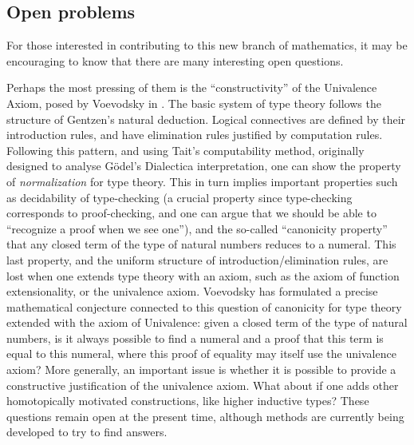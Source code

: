 %

\subsection{Open problems} 

%

For those interested in contributing to this new branch of mathematics, it may be encouraging to know that there are many interesting open questions.

%
Perhaps the most pressing of them is the ``constructivity'' of the Univalence Axiom, posed by Voevodsky in \citep{Universe-poly}.
The basic system of type theory follows the structure of Gentzen's natural deduction. Logical connectives are defined by their introduction rules, and have elimination rules justified by computation rules. Following this pattern, and using Tait's computability method, originally designed to analyse G\"odel's Dialectica interpretation, one can show the property of \emph{normalization} for type theory. This in turn implies important properties such as decidability of type-checking (a crucial property since type-checking corresponds to proof-checking, and one can argue that we should be able to ``recognize a proof when we see one''), and the so-called ``canonicity property'' that any closed term of the type of natural numbers reduces to a numeral. This last property, and the uniform structure of introduction/elimination rules, are lost when one extends type theory with an axiom, such as the axiom of function extensionality, or the univalence axiom. Voevodsky has formulated a precise mathematical conjecture connected to this question of canonicity for type theory extended with the axiom of Univalence: given a closed term of the type of natural numbers, is it always possible to find a numeral and a proof that this term is equal to this numeral, where this proof of equality may itself use the univalence axiom? More generally, an important issue is whether it is possible to provide a constructive justification of the univalence axiom.
What about if one adds other homotopically motivated constructions, like higher inductive types?
These questions remain open at the present time, although methods are currently being developed to try to find answers.

